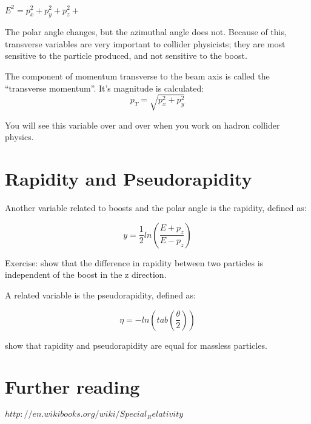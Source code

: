 	$E^2 = p_x^2 + p_y^2 + p_z^2 +$  

The polar angle changes, but the azimuthal angle does not.  Because of this, transverse variables are very important to collider physicists; they are most sensitive to the particle produced, and not sensitive to the boost.

The component of momentum transverse to the beam axis is called the “transverse momentum”.  It’s magnitude is calculated:
\begin{equation}
	 p_T =   \sqrt{p_x^2 +p_y^2}
\end{equation} 
  

You will see this variable over and over when you work on hadron collider physics.

\section{Rapidity and Pseudorapidity}

Another variable related to boosts and the polar angle is the rapidity, defined as:

\begin{equation}
	 y =  \frac{1}{2} ln (\frac{E + p_z}{E-p_z})
\end{equation} 
	  

Exercise: show that the difference in rapidity between two particles is independent of the boost in the z direction.

A related variable is the pseudorapidity, defined as:

\begin{equation}
	 \eta  = - ln (tab (\frac{\theta}{2}))
\end{equation} 


\vspace{.2cm} 
\begin{minipage}{0.7\textwidth} 
\begin{framed}
\begin{exercise}
{show that rapidity and pseudorapidity are equal for massless particles.}
\end{exercise}
\end{framed} 
\end{minipage}
\vspace{.2cm}



\section{Further reading}
	
$http://en.wikibooks.org/wiki/Special_Relativity$

